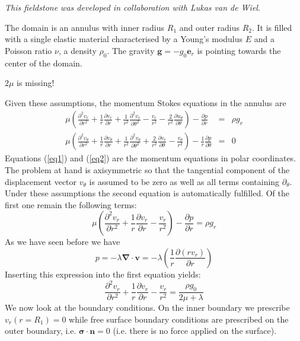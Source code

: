 
{\sl This fieldstone was developed in collaboration with Lukas van de Wiel}.

The domain is an annulus with inner radius $R_1$ and outer radius $R_2$. It is filled with a 
single elastic material characterised by a Young's modulus $E$ and a Poisson ratio $\nu$, a
density $\rho_0$. The gravity ${\bm g}=-g_0 {\bm e}_r$ is pointing towards the center of the domain.

{\color{red} $2\mu$ is missing!}

Given these assumptions, the momentum Stokes equations in the annulus are~\cite{scto01}
\begin{eqnarray}
\mu \left(   \frac{\partial^2 v_r}{\partial r^2} + \frac{1}{r} \frac{\partial v_r}{\partial r} +   
      \frac{1}{r^2} \frac{\partial^2 v_r}{\partial \theta^2}
    - \frac{v_r}{r^2} - \frac{2}{r^2} \frac{\partial u_\theta}{\partial \theta} \right)
-\frac{\partial p}{\partial r}  &=& \rho g_r \label{eq1} \\
\mu \left( \frac{\partial^2 v_\theta}{\partial r^2} + \frac{1}{r} \frac{\partial v_\theta}{\partial r} + \frac{1}{r^2} \frac{\partial^2 v_\theta}{\partial \theta^2}
+\frac{2}{r^2} \frac{\partial v_r}{\partial \theta} - \frac{v_\theta}{r^2} \right)
-\frac{1}{r}\frac{\partial p}{\partial \theta} &=& 0
\label{eq2} 
\end{eqnarray}
Equations (\ref{eq1}) and (\ref{eq2}) are the momentum equations in polar coordinates.
The problem at hand is axisymmetric so that the tangential component of the displacement
vector $v_\theta$ is assumed to be zero as well as all terms containing $\partial_\theta$.
Under these assumptions the second equation is automatically fulfilled.
Of the first one remain the following terms:
\[
\mu\left( \frac{\partial^2 v_r}{\partial r^2} + \frac{1}{r} \frac{\partial v_r}{\partial r} - \frac{v_r}{r^2} \right)
-\frac{\partial p}{\partial r}  = \rho g_r 
\]
As we have seen before we have 
\[
p=-\lambda {\bm \nabla}\cdot {\bm v}
= -\lambda \left( \frac{1}{r} \frac{\partial (r v_r)}{\partial r} \right)
\]
Inserting this expression into the first equation yields:
\[
\frac{\partial^2 v_r}{\partial r^2} + \frac{1}{r} \frac{\partial v_r}{\partial r} - \frac{v_r}{r^2} 
= \frac{\rho g_0 }{2\mu + \lambda}
\]
We now look at the boundary conditions. On the inner boundary we prescribe $v_r(r=R_1)=0$ while free
surface boundary conditions are prescribed on the outer boundary, i.e. ${\bm \sigma}\cdot{\bm n}=0$
(i.e. there is no force applied on the surface).

